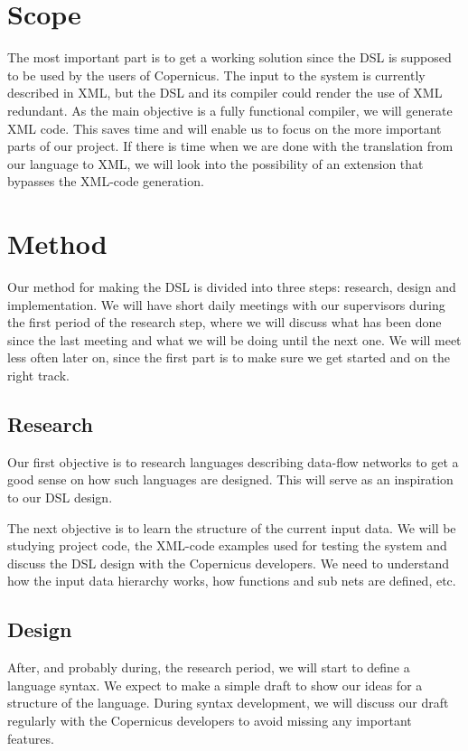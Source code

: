 \documentclass[a4paper]{article}
\begin{document}
\section{Scope}
The most important part is to get a working solution since the DSL is
supposed to be used by the users of Copernicus. The input to the
system is currently described in XML, but the DSL and its compiler
could render the use of XML redundant. As the main objective is a
fully functional compiler, we will generate XML code. This saves time
and will enable us to focus on the more important parts of our
project. If there is time when we are done with the translation from
our language to XML, we will look into the possibility of an extension
that bypasses the XML-code generation.

\section{Method}
Our method for making the DSL is divided into three steps: research,
design and implementation. We will have short daily meetings with our
supervisors during the first period of the research step, where we
will discuss what has been done since the last meeting and what we
will be doing until the next one. We will meet less often later on,
since the first part is to make sure we get started and on the right
track.

\subsection{Research}
Our first objective is to research languages describing data-flow
networks to get a good sense on how such languages are designed. This
will serve as an inspiration to our DSL design.

The next objective is to learn the structure of the current input
data. We will be studying project code, the XML-code examples used for
testing the system and discuss the DSL design with the Copernicus
developers. We need to understand how the input data hierarchy works,
how functions and sub nets are defined, etc.

\subsection{Design}
After, and probably during, the research period, we will start to
define a language syntax. We expect to make a simple draft to show our
ideas for a structure of the language. During syntax development, we
will discuss our draft regularly with the Copernicus developers to
avoid missing any important features.
\end{document}
